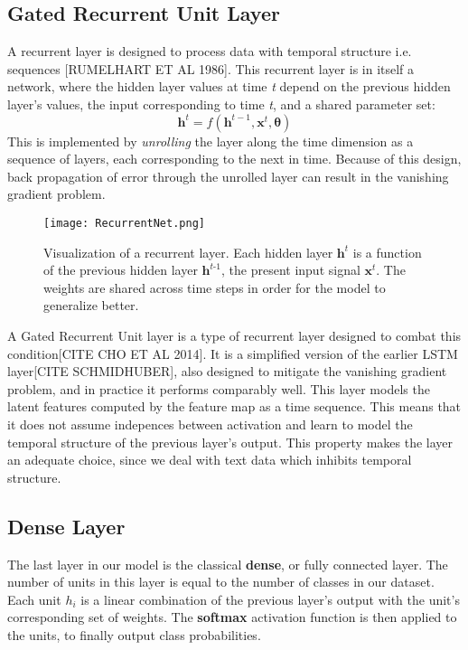 \subsection{Gated Recurrent Unit Layer}
A recurrent layer is designed to process data with temporal structure i.e. sequences [RUMELHART ET AL 1986].
This recurrent layer is in itself a network, where the hidden layer values at time \textit{t} depend on the previous
hidden layer's values, the input corresponding to time \textit{t}, and a shared parameter set:
\[\bm{h}^{t} = f(\bm{h}^{t-1}, \bm{x}^{t}, \bm{\theta})\]
This is implemented by \textit{unrolling} the layer along the time dimension as a sequence of layers, each corresponding
to the next in time. Because of this design, back propagation of error through the unrolled layer can result
in the vanishing gradient problem.

\begin{figure}[H]
\caption{Visualization of a recurrent layer. Each hidden layer $\bm{h}^{\textit{t}}$ is a function of the previous hidden
layer $\bm{h}^{\textit{t-1}}$, the present input signal $\bm{x}^{\textit{t}}$. The weights are shared across time steps
in order for the model to generalize better.}
\centering
\texttt{[image: RecurrentNet.png]}
\end{figure}

A Gated Recurrent Unit layer is a type of recurrent layer designed to combat this condition[CITE CHO ET AL 2014].
It is a simplified version of the earlier LSTM layer[CITE SCHMIDHUBER], also designed to mitigate the vanishing gradient problem,
and in practice it performs comparably well.
This layer models the latent features computed by the feature map as a time sequence. This means that it
does not assume indepences between activation and learn to model the temporal structure of the previous
layer's output. This property makes the layer an adequate choice, since we deal with text data which inhibits
temporal structure.

\subsection{Dense Layer}
The last layer in our model is the classical \textbf{dense}, or fully connected layer.
The number of units in this layer is equal to the number of classes in our dataset.
Each unit $h_i$ is a linear combination of the previous layer's output with the unit's
corresponding set of weights. The \textbf{softmax} activation function is then applied to
the units, to finally output class probabilities.


